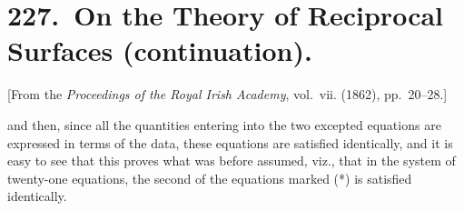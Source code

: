 \documentclass[11pt,a4paper]{book}
\theoremstyle{plain}
\begin{document}
\mainmatter
\setcounter{chapter}{226}

\chapter[On the Theory of Reciprocal Surfaces (cont.)]{227.\ On the Theory of Reciprocal Surfaces (continuation).}
\label{paper227cont}

\begin{center}
\small
[From the \textit{Proceedings of the Royal Irish Academy}, vol.~vii. (1862), pp.~20--28.]
\end{center}

\bigskip

\medskip

\noindent
and then, since all the quantities entering into the two excepted equations are expressed in terms of the data, these equations are satisfied identically, and it is easy to see that this proves what was before assumed, viz., that in the system of twenty-one equations, the second of the equations marked (*) is satisfied identically.
\end{document}
